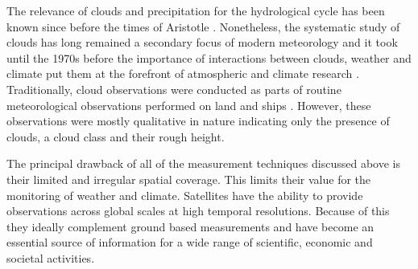 The relevance of clouds and precipitation for the hydrological cycle has been
known since before the times of Aristotle \citep{frisinger72}. Nonetheless, the
systematic study of clouds has long remained a secondary focus of modern
meteorology and it took until the 1970s before the importance of interactions
between clouds, weather and climate put them at the forefront of atmospheric and
climate research \citep{stephens03}. Traditionally, cloud observations were
conducted as parts of routine meteorological observations performed on land and
ships \citep{hughes84}. However, these observations were mostly qualitative in
nature indicating only the presence of clouds, a cloud class and their rough
height.

The principal drawback of all of the measurement techniques discussed above is
their limited and irregular spatial coverage. This limits their value for the
monitoring of weather and climate. Satellites have the ability to provide
observations across global scales at high temporal resolutions. Because of this
they ideally complement ground based measurements and have become an essential
source of information for a wide range of scientific, economic and societal
activities.

